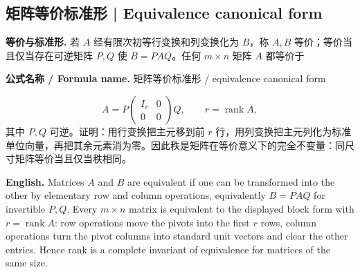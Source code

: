 \documentclass[UTF8,11pt,a4paper]{ctexart}
\newcommand{\EN}[1]{\par\noindent\textbf{English.} #1\par}
\newcommand{\FORMULA}[2]{\par\noindent\textbf{公式名称 / Formula name.} #1 / #2\par}
\begin{document}
\subsection{矩阵等价标准形 | Equivalence canonical form}
\noindent\textbf{等价与标准形.} 若 $A$ 经有限次初等行变换和列变换化为 $B$，称 $A,B$ 等价；等价当且仅当存在可逆矩阵 $P,Q$ 使 $B=PAQ$。任何 $m\times n$ 矩阵 $A$ 都等价于
\FORMULA{矩阵等价标准形}{equivalence canonical form}
\[
A=P\begin{pmatrix}I_r&0\\0&0\end{pmatrix}Q,\qquad r=\operatorname{rank}A,
\]
其中 $P,Q$ 可逆。证明：用行变换把主元移到前 $r$ 行，用列变换把主元列化为标准单位向量，再把其余元素消为零。因此秩是矩阵在等价意义下的完全不变量：同尺寸矩阵等价当且仅当秩相同。
\EN{Matrices $A$ and $B$ are equivalent if one can be transformed into the other by elementary row and column operations, equivalently $B=PAQ$ for invertible $P,Q$. Every $m\times n$ matrix is equivalent to the displayed block form with $r=\operatorname{rank}A$: row operations move the pivots into the first $r$ rows, column operations turn the pivot columns into standard unit vectors and clear the other entries. Hence rank is a complete invariant of equivalence for matrices of the same size.}
\end{document}
